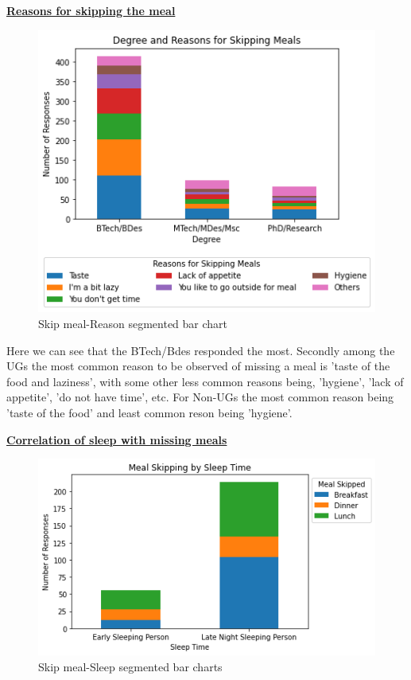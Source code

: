 \documentclass{article}
\begin{document}
\centerline{\underline{\bfseries{Reasons for skipping the meal}}}
\begin{figure}[H]
    \centering
    \includegraphics[scale = 0.8]{Meal Skipping - Reason Seg chart.png}
    \caption{Skip meal-Reason segmented bar chart}  
    \label{fig:Meal Skipping - Reason Seg chart}
\end{figure}
Here we can see that the BTech/Bdes responded the most. Secondly among the UGs the most common reason to be observed of missing a meal is 'taste of the food and laziness', with some other less common reasons being, 'hygiene', 'lack of appetite', 'do not have time', etc. For Non-UGs the most common reason being 'taste of the food' and least common reson being 'hygiene'.\\
\centerline{\underline{\bfseries{Correlation of sleep with missing meals}}}
\begin{figure}[H]
    \centering
    \includegraphics[scale = 0.8]{Meal Skipping - Sleep time Seg chart.png}
    \caption{Skip meal-Sleep segmented bar charts}  
    \label{fig:Meal Skipping - Sleep time Seg chart}
\end{figure}
\end{document}
